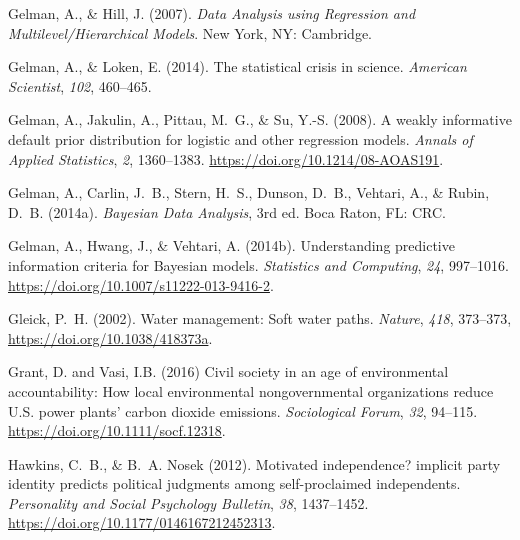 \documentclass[draft]{agujournal}\usepackage{knitr}
\begin{document}
\begin{thebibliography}{33}
  Gelman, A., \& Hill, J. (2007).
  \textit{Data Analysis using Regression and Multilevel/Hierarchical Models}.
  New York, NY: Cambridge.

  Gelman, A., \& Loken, E. (2014).
  The statistical crisis in science.
  \textit{American Scientist}, \textit{102}, 460--465.

  Gelman, A., Jakulin, A., Pittau, M.~G., \& Su, Y.-S. (2008).
  A weakly informative default prior distribution for logistic and other
  regression models.
  \textit{Annals of Applied Statistics}, \textit{2}, 1360--1383.
  \url{https://doi.org/10.1214/08-AOAS191}.

  Gelman, A., Carlin, J.~B., Stern, H.~S., Dunson, D.~B., Vehtari, A., \&
  Rubin, D.~B. (2014a).
  \textit{{B}ayesian Data Analysis}, 3rd ed.
  Boca Raton, FL: CRC.

  Gelman, A., Hwang, J., \& Vehtari, A. (2014b).
  Understanding predictive information criteria for Bayesian models.
  \textit{Statistics and Computing}, \textit{24}, 997--1016.
  \url{https://doi.org/10.1007/s11222-013-9416-2}.

  Gleick, P.~H. (2002).
  Water management: {S}oft water paths.
  \textit{Nature},
  \textit{418}, 373--373, \url{https://doi.org/10.1038/418373a}.

  Grant, D. and Vasi, I.B. (2016)
  Civil society in an age of environmental accountability:
  How local environmental nongovernmental organizations reduce
  U.S. power plants' carbon dioxide emissions.
  \textit{Sociological Forum}, \textit{32}, 94--115.
  \url{https://doi.org/10.1111/socf.12318}.

  Hawkins, C.~B., \& B.~A. Nosek (2012).
  Motivated independence? implicit party identity predicts political judgments
  among self-proclaimed independents.
  \textit{Personality and Social Psychology Bulletin}, \textit{38}, 1437--1452.
  \url{https://doi.org/10.1177/0146167212452313}.


\end{thebibliography}
\end{document}
